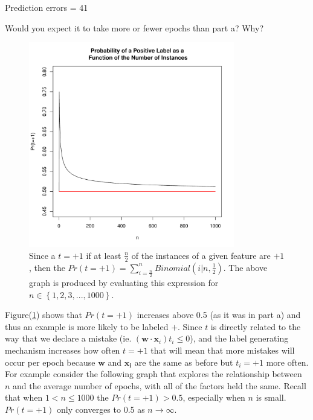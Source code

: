 \documentclass{article}
\begin{document}
Prediction errors = 41

Would you expect it to take more or fewer epochs than part a? Why?

\begin{figure}[h!]
\centering
\includegraphics[width=0.8\textwidth]{bFig.pdf}
\caption{Since a $t=+1$ if at least $\frac{n}{2}$ of the instances of a given feature are $+1$, then the \mbox{$Pr(t=+1)=\sum_{i=\frac{n}{2}}^n Binomial(i|n,\frac{1}{2})$.}
The above graph is produced by evaluating this expression for \mbox{$n\in\left\{1,2,3,...,1000\right\}$.}
}
\label{bFig}
\end{figure}

Figure(\ref{bFig}) shows that $Pr(t=+1)$ increases above 0.5 (as it was in part a) and thus an example is more likely to be labeled $+$. 
Since $t$ is directly related to the way that we declare a mistake (ie. $(\bm{w\cdot x}_i) t_i \le0$), and the label generating mechanism increases how often $t=+1$ that will mean that more mistakes will occur per epoch because $\bm{w}$ and $\bm{x_i}$ are the same as before but $t_i=+1$ more often. %
For example consider the following graph that explores the relationship between $n$ and the average number of epochs, with all of the factors held the same.
Recall that when $1<n\le1000$ the $Pr(t=+1)>0.5$, especially when $n$ is small.
$Pr(t=+1)$ only converges to 0.5 as $n\rightarrow\infty$.
\end{document}
